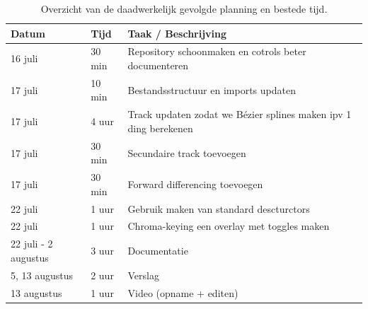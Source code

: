 \documentclass[11pt,a4paper]{article}
\begin{document}
\begin{table}[h!]
\centering
\small %
\begin{tabularx}{\textwidth}{@{} l l X @{}}
\toprule
\textbf{Datum} & \textbf{Tijd} & \textbf{Taak / Beschrijving} \\
\midrule
16 juli & 30 min & Repository schoonmaken en cotrols beter documenteren \\
17 juli & 10 min & Bestandsstructuur en imports updaten \\
17 juli & 4 uur & Track updaten zodat we Bézier splines maken ipv 1 ding berekenen \\
17 juli & 30 min & Secundaire track toevoegen \\
17 juli & 30 min & Forward differencing toevoegen \\
22 juli & 1 uur & Gebruik maken van standard descturctors \\
22 juli & 1 uur & Chroma-keying een overlay met toggles maken \\
22 juli - 2 augustus & 3 uur & Documentatie \\
5, 13 augustus & 2 uur & Verslag \\
13 augustus & 1 uur & Video (opname + editen) \\
\bottomrule
\end{tabularx}
\caption{Overzicht van de daadwerkelijk gevolgde planning en bestede tijd.}
\end{table}
\end{document}
